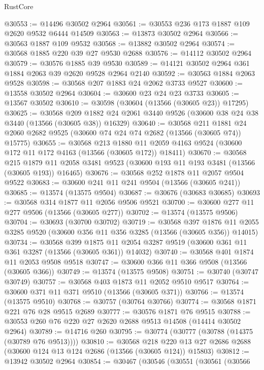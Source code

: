 \begin{lexlean}{RustCore}
\begin{coremodule}
@30553 := @14496 @30502 @2964
@30561 := @30553 @236 @173 @1887 @109 @2620 @9532 @6444 @14509
@30563 := @13873 @30502 @2964
@30566 := @30563 @1887 @109 @9532
@30568 := @13882 @30502 @2964
@30574 := @30568 @1885 @220 @39 @27 @9530 @2688
@30576 := @14112 @30502 @2964
@30579 := @30576 @1885 @39 @9530
@30589 := @14121 @30502 @2964 @361 @1884 @2063 @39 @2620 @9528 @2964 @2140
@30592 := @30563 @1884 @2063 @9528
@30598 := @30568 @207 @1883 @24 @2062 @3733 @9527
@30600 := @13558 @30502 @2964
@30604 := @30600 @23 @24 @23 @3733
@30605 := @13567 @30502
@30610 := @30598 (@30604 (@13566 (@30605 @23)) @17295)
@30625 := @30568
    @209
    @1882
    @24
    @2061
    @3440
    @9526
    (@30600 @38 @24 @38 @3440 (@13566 (@30605 @38)) @16329)
@30640 := @30568
    @211
    @1881
    @24
    @2060
    @2682
    @9525
    (@30600 @74 @24 @74 @2682 (@13566 (@30605 @74)) @15775)
@30655 := @30568
    @213
    @1880
    @11
    @2059
    @4163
    @9524
    (@30600 @172 @11 @172 @4163 (@13566 (@30605 @172)) @18411)
@30670 := @30568
    @215
    @1879
    @11
    @2058
    @3481
    @9523
    (@30600 @193 @11 @193 @3481 (@13566 (@30605 @193)) @16465)
@30676 := @30568 @252 @1878 @11 @2057 @9504 @9522
@30683 := @30600 @241 @11 @241 @9504 (@13566 (@30605 @241))
@30685 := @13574 (@13575 @9504)
@30687 := @30676 (@30683 @30685)
@30693 := @30568 @314 @1877 @11 @2056 @9506 @9521
@30700 := @30600 @277 @11 @277 @9506 (@13566 (@30605 @277))
@30702 := @13574 (@13575 @9506)
@30704 := @30693 (@30700 @30702)
@30719 := @30568
    @397
    @1876
    @11
    @2055
    @3285
    @9520
    (@30600 @356 @11 @356 @3285 (@13566 (@30605 @356)) @14015)
@30734 := @30568
    @399
    @1875
    @11
    @2054
    @3287
    @9519
    (@30600 @361 @11 @361 @3287 (@13566 (@30605 @361)) @14032)
@30740 := @30568 @401 @1874 @11 @2053 @9508 @9518
@30747 := @30600 @366 @11 @366 @9508 (@13566 (@30605 @366))
@30749 := @13574 (@13575 @9508)
@30751 := @30740 (@30747 @30749)
@30757 := @30568 @403 @1873 @11 @2052 @9510 @9517
@30764 := @30600 @371 @11 @371 @9510 (@13566 (@30605 @371))
@30766 := @13574 (@13575 @9510)
@30768 := @30757 (@30764 @30766)
@30774 := @30568 @1871 @221 @76 @28 @9515 @2689
@30777 := @30576 @1871 @76 @9515
@30788 := @30553 @260 @76 @220 @27 @2620 @2688 @9513 @14508 (@14414 @30502 @2964)
@30789 := @14716 @260
@30795 := @30774 (@30777 (@30788 (@14375 (@30789 @76 @9513))))
@30810 := @30568
    @218
    @220
    @13
    @27
    @2686
    @2688
    (@30600 @124 @13 @124 @2686 (@13566 (@30605 @124)) @15803)
@30812 := @13942 @30502 @2964
@30854 := @30467
    (@30546
      (@30551
        (@30561
          (@30566

\end{coremodule}
\end{lexlean}
